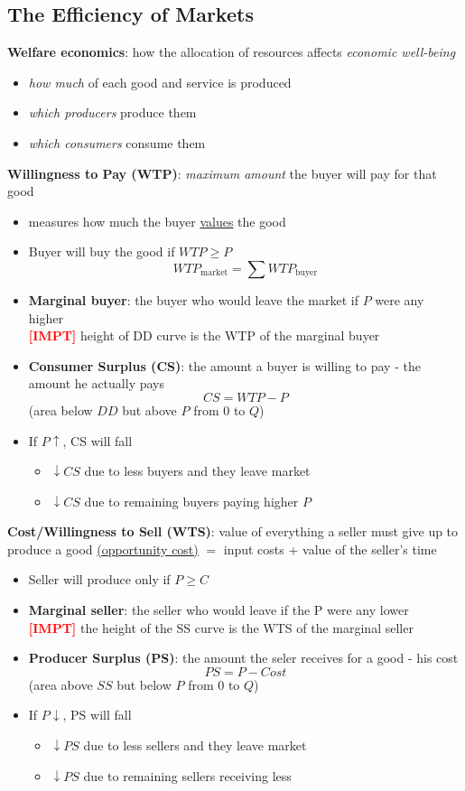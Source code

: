 \documentclass{article}
\newcommand{\impt}[0]{\textcolor{red}{\textbf{[IMPT] }}}
\begin{document}
\begin{multicols}{2}
\subsection{The Efficiency of Markets}
\textbf{Welfare economics}: how the allocation of resources affects \textit{economic well-being}
\begin{itemize}
	\item \textit{how much} of each good and service is produced
	\item \textit{which producers} produce them
	\item \textit{which consumers} consume them\\
\end{itemize}
\textbf{Willingness to Pay (WTP)}: \textit{maximum amount} the buyer will pay for that good
\begin{itemize}
	\item measures how much the buyer \underline{values} the good
	\item Buyer will buy the good if $WTP \geq P$
	$$WTP_{\text{market}} = \sum WTP_{\text{buyer}}$$
	\item \textbf{Marginal buyer}: the buyer who would leave the market if $P$ were any higher\\
	\impt height of DD curve is the WTP of the marginal buyer
	\item \textbf{Consumer Surplus (CS)}: the amount a buyer is willing to pay - the amount he actually pays
	$$CS = WTP - P$$
	(area below $DD$ but above $P$ from 0 to $Q$)
	\item If $P \uparrow$, CS will fall
	\begin{itemize}
		\item $\downarrow CS$ due to less buyers and they leave market
		\item $\downarrow CS$ due to remaining buyers paying higher $P$\\
	\end{itemize}
\end{itemize}
\textbf{Cost/Willingness to Sell (WTS)}: value of everything a seller must give up to produce a good \underline{(opportunity cost)} $=$ input costs + value of the seller's time
\begin{itemize}
	\item Seller will produce only if $P \geq C$
	\item \textbf{Marginal seller}: the seller who would leave if the P were any lower\\
	\impt the height of the SS curve is the WTS of the marginal seller
	\item \textbf{Producer Surplus (PS)}: the amount the seler receives for a good - his cost
	$$PS = P - Cost$$
	(area above $SS$ but below $P$ from 0 to $Q$)
	\item If $P \downarrow$, PS will fall
	\begin{itemize}
		\item $\downarrow PS$ due to less sellers and they leave market
		\item $\downarrow PS$ due to remaining sellers receiving less\\
	\end{itemize}
\end{itemize}


\end{multicols}
\end{document}
